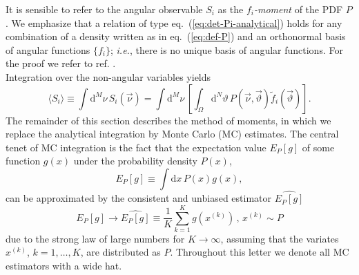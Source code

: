 \documentclass[aps,prd,reprint,nofootinbib,preprintnumbers]{revtex4}
\newcommand{\dual}[1]{\tilde{#1}}
\newcommand{\est}[1]{\widehat{#1}}
\newcommand{\ie}{\textit{i.e.}}
\newcommand{\nuvec}{\vec{\nu}}
\newcommand{\refeq}[1]{eq.~(\ref{eq:#1})}
\newcommand{\rmdx}[1]{\mbox{d} #1 \,} %
\newcommand{\thvec}{\vec{\vartheta}}
\renewcommand{\theta}{\vartheta}
\begin{document}
It is sensible to refer to the angular observable $S_i$ as the
\emph{$f_i$-moment} of the PDF $P$.  We emphasize that a relation of
type \refeq{det-Pi-analytical} holds for any combination of a density
written as in \refeq{def-P} and an orthonormal basis of angular
functions $\lbrace f_i \rbrace$; \ie, there is no unique
basis of angular functions. For the proof we refer to ref. \cite{Dighe:1998vk}.\\

Integration over the non-angular variables yields
\begin{equation}
    \langle S_i\rangle
    \equiv \int \rmdx{^M \nu} S_i(\nuvec)
    = \int \rmdx{^M \nu} \left[\int_{\Omega} \rmdx{^N \theta} P(\nuvec,\thvec) \dual{f}_i(\thvec) \right].
\end{equation}
The remainder of this section describes the method of moments, in
which we replace the analytical integration by Monte Carlo (MC)
estimates.  The central tenet of MC integration is the fact that the
expectation value $E_P[g]$ of some function $g(x)$ under the
probability density $P(x)$,
\begin{equation}
    E_P[g] \equiv \int \rmdx{x} P(x) g(x),
\end{equation}
can be approximated by the consistent and unbiased
estimator $\est{E_P[g]}$~\cite[sec. 8.2]{James:2006zz}
\begin{equation}
    \label{eq:mc-id}
    E_P[g] \to \widehat{E_P[g]} \equiv \frac{1}{K} \sum_{k=1}^K g(x^{(k)}) \,,\,    x^{(k)} \sim P
\end{equation}
due to the strong law of large numbers for $K \to \infty$, assuming
that the variates $x^{(k)}$, $k = 1, \dots, K$, are distributed as
$P$.
Throughout this letter we denote all MC estimators with a wide hat.\\
\end{document}
